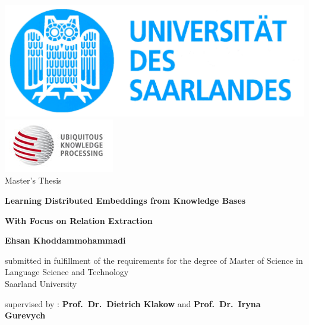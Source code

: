 \documentclass[a4paper, 11pt]{book}
\begin{document}
\frontmatter %

\thispagestyle{empty}
\begin{center}
\includegraphics{logo-saarbr-small.jpg}
\includegraphics{ukp-logo.jpg} \\
\vspace{2 cm}
\large{
Master's Thesis \\
}
\end{center}


\vspace{2 cm}
\centerline{\LARGE\textbf{Learning Distributed Embeddings from Knowledge Bases}}
\centerline{\LARGE\textbf{With Focus on Relation Extraction}}



\vspace{2 cm}
\begin{center}
\textbf{Ehsan Khoddammohammadi \\}
\end{center}
\begin{center}
\large{
submitted in fulfillment of the requirements
for the degree of Master of Science in Language Science and Technology\\
Saarland University\\

}
\end{center}
\vspace{1 cm}
\begin{center}
\large{
supervised by : \textbf{Prof.~Dr.~Dietrich Klakow} and \textbf{Prof.~Dr.~Iryna
Gurevych}\\
}
\end{center}

\newpage




\newpage




\begingroup
\def\addvspace#1{}
\tableofcontents
\endgroup
\newpage

\mainmatter %








%

\newpage



\end{document}
